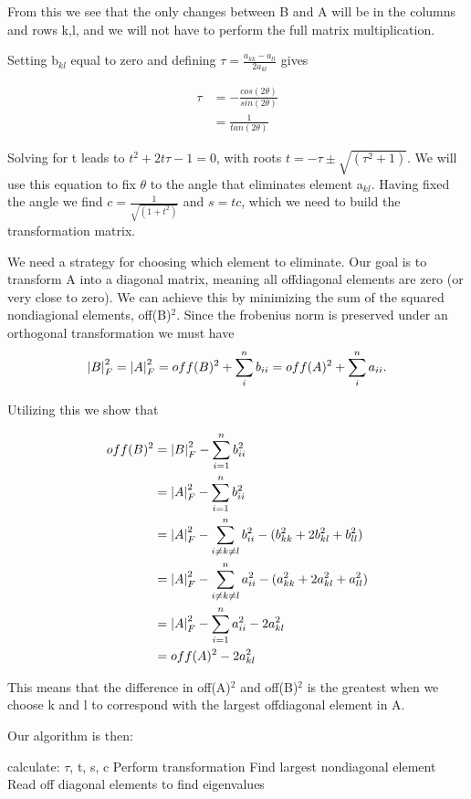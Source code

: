 From this we see that the only changes between B and A will be in the columns
and rows k,l, and we will not have to perform the full matrix multiplication.

Setting b$_{kl}$ equal to zero and defining $\tau = \frac{a_{kk} - a_{ll}}{2a_{kl}}$
gives

\begin{align*}
  \tau &= -\frac{cos(2\theta)}{sin(2\theta)} \\
  &=  \frac{1}{tan(2\theta)}
\end{align*}

Solving for t leads to $t^2 + 2t\tau -1 = 0$, with roots $t = -\tau \pm \sqrt{(\tau^2 + 1)}$. We will
use this equation to fix $\theta$ to the angle that eliminates element a$_{kl}$.
Having fixed the angle we find $c = \frac{1}{\sqrt{(1+t^2)}}$ and $s = tc$, which
we need to build the transformation matrix.

We need a strategy for choosing which element to eliminate. Our goal is to
transform A into a diagonal matrix, meaning all offdiagonal elements are zero
(or very close to zero). We can achieve this by minimizing the sum of the
squared nondiagional elements, off(B)$^2$. Since the frobenius norm is
preserved under an orthogonal transformation we must have
$$ \abs{B}_F^2 = \abs{A}_F^2 =  off(B)^2 + \sum_{i}^{n} b_{ii} = off(A)^2 + \sum_{i}^{n} a_{ii}.$$

Utilizing this we show that

\begin{align*}
  off(B)^2 &= \abs{B}_F^2 - \sum_{i=1}^{n} b_{ii}^2 \\
  &= \abs{A}_F^2 - \sum_{i=1}^{n} b_{ii}^2 \\
  &= \abs{A}_F^2 - \sum_{i \neq k \neq l}^{n} b_{ii}^2 - (b_{kk}^2 + 2b_{kl}^2 + b_{ll}^2) \\
  &= \abs{A}_F^2 - \sum_{i\neq k \neq l}^{n} a_{ii}^2 - (a_{kk}^2 + 2a_{kl}^2 + a_{ll}^2) \\
  &= \abs{A}_F^2 - \sum_{i=1}^{n} a_{ii}^2 - 2a_{kl}^2 \\
  &= off(A)^2 - 2a_{kl}^2
\end{align*}

This means that the difference in off(A)$^2$ and off(B)$^2$ is the greatest
when we choose k and l to correspond with the largest offdiagonal element in A.

Our algorithm is then:

\begin{algorithmic}
    \State calculate: $\tau$, t, s, c
    \State Perform transformation
    \State Find largest nondiagonal element
  \EndWhile
  \State Read off diagonal elements to find eigenvalues
\end{algorithmic}


